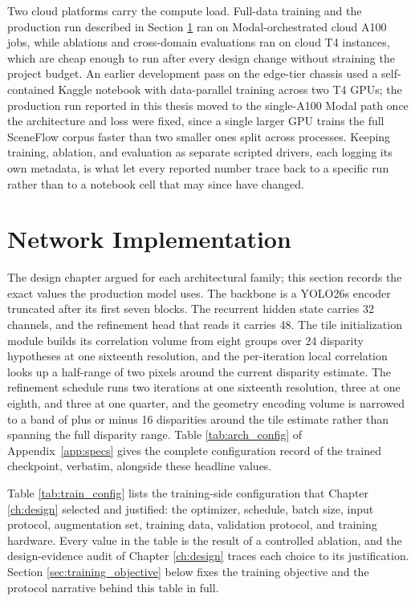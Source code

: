 Two cloud platforms carry the compute load. Full-data training and the
production run described in Section \ref{sec:network_implementation}
ran on Modal-orchestrated cloud A100 jobs, while ablations and
cross-domain evaluations ran on cloud T4 instances, which are cheap
enough to run after every design change without straining the project
budget. An earlier development pass on the edge-tier chassis used a
self-contained Kaggle notebook with data-parallel training across two
T4 GPUs; the production run reported in this thesis moved to the
single-A100 Modal path once the architecture and loss were fixed, since
a single larger GPU trains the full SceneFlow corpus faster than two
smaller ones split across processes. Keeping training, ablation, and
evaluation as separate scripted drivers, each logging its own metadata,
is what let every reported number trace back to a specific run rather
than to a notebook cell that may since have changed.

\FloatBarrier
\section{Network Implementation}
\label{sec:network_implementation}
The design chapter argued for each architectural family; this section
records the exact values the production model uses. The backbone is a
YOLO26s encoder truncated after its first seven blocks. The recurrent
hidden state carries 32 channels, and the refinement head that reads it
carries 48. The tile initialization module builds its correlation
volume from eight groups over 24 disparity hypotheses at one sixteenth
resolution, and the per-iteration local correlation looks up a
half-range of two pixels around the current disparity estimate. The
refinement schedule runs two iterations at one sixteenth resolution,
three at one eighth, and three at one quarter, and the geometry
encoding volume is narrowed to a band of plus or minus 16 disparities
around the tile estimate rather than spanning the full disparity range.
Table \ref{tab:arch_config} of Appendix~\ref{app:specs} gives the complete
configuration record of the trained checkpoint, verbatim, alongside
these headline values.

Table \ref{tab:train_config} lists the training-side configuration that
Chapter \ref{ch:design} selected and justified: the optimizer, schedule,
batch size, input protocol, augmentation set, training data, validation
protocol, and training hardware. Every value in the table is the result
of a controlled ablation, and the design-evidence audit of
Chapter \ref{ch:design} traces each choice to its justification.
Section \ref{sec:training_objective} below fixes the
training objective and the protocol narrative behind this table in
full.

